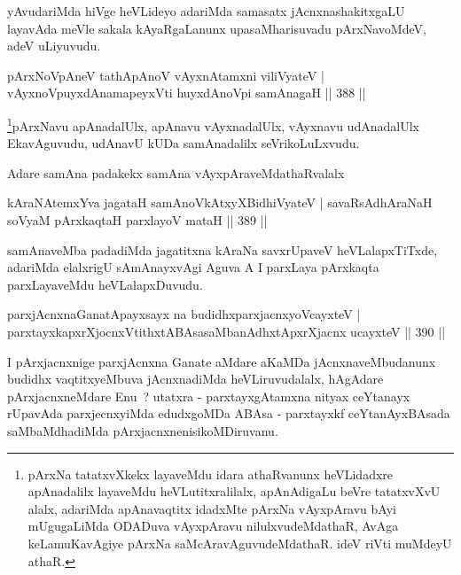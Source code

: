 \begin{artha}
yAvudariMda hiVge heVLideyo adariMda samasatx jAcnxnashakitxgaLU layavAda meVle sakala kAyaRgaLanunx upasaMharisuvadu pArxNavoMdeV, adeV uLiyuvudu.
\end{artha}


\begin{shl}
pArxNoV\s pAneV tathA\s pAnoV vAyxnAtamxni viliVyateV |
vAyxnoV\s puyxdAnamapeyxVti huyxdAnoV\s pi samAnagaH \hfill || 388 ||
\end{shl}

\begin{artha}
\footnote[1]{pArxNa tatatxvXkekx layaveMdu idara athaRvanunx heVLidadxre apAnadalilx layaveMdu heVLutitxralilalx, apAnAdigaLu beVre tatatxvXvU alalx, adariMda apAnavaqtitx idadxMte pArxNa vAyxpAravu bAyi mUgugaLiMda ODADuva vAyxpAravu nilulxvudeMdathaR, AvAga keLamuKavAgiye pArxNa saMcAravAguvudeMdathaR. ideV riVti muMdeyU athaR.}pArxNavu apAnadalUlx, apAnavu vAyxnadalUlx, vAyxnavu udAnadalUlx EkavAguvudu, udAnavU kUDa samAnadalilx seVrikoLuLxvudu.
\end{artha}

\begin{artha}
Adare samAna padakekx samAna vAyxpAraveMdathaRvalalx
\end{artha}

\begin{shl}
kAraNAtemxYva jagataH samAnoVkAtxyX\s BidhiVyateV |
savaRsAdhAraNaH soV\s yaM pArxkaqtaH parxlayoV mataH \hfill || 389 ||
\end{shl}

\begin{artha}
samAnaveMba padadiMda jagatitxna kAraNa savxrUpaveV heVLalapxTiTxde, adariMda elalxrigU sAmAnayxvAgi Aguva A I parxLaya pArxkaqta parxLayaveMdu heVLalapxDuvudu.
\end{artha}


\begin{shl}
parxjAcnxnaGanatA\s payxsayx na budidhxparxjacnxyoVcayxteV |
parxtayxkapxrXjocnxVtithxtABAsasaMbanAdhxtApxrXjacnx ucayxteV \hfill || 390 ||
\end{shl}

\begin{artha}
I pArxjacnxnige parxjAcnxna Ganate aMdare aKaMDa jAcnxnaveMbudanunx budidhx vaqtitxyeMbuva jAcnxnadiMda heVLiruvudalalx, hAgAdare pArxjacnxneMdare Enu~? utatxra - parxtayxgAtamxna nityax ceYtanayx rUpavAda parxjecnxyiMda edudxgoMDa ABAsa - parxtayxkf ceYtanAyxBAsada saMbaMdhadiMda pArxjacnxnenisikoMDiruvanu.
\end{artha}

